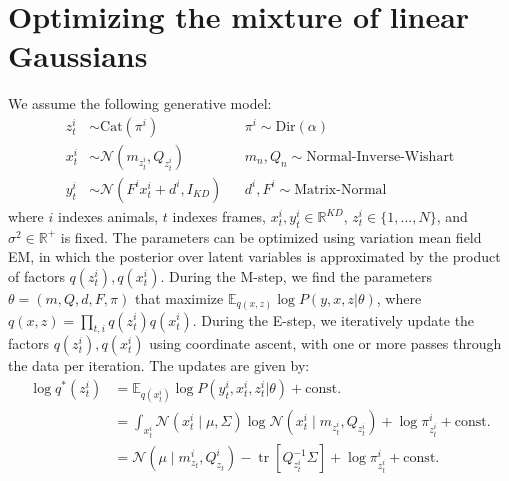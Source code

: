 \documentclass{article}         %
\DeclareMathOperator{\tr}{tr}
\begin{document}
\label{full-model-derivation}
\section{Optimizing the mixture of linear Gaussians}

We assume the following generative model:
\begin{align}
    z_t^i & \sim \text{Cat}(\pi^i) && 
    \pi^i \sim \text{Dir}(\alpha) \\
    x_t^i & \sim \mathcal{N}(m_{z_t^i}, Q_{z_t^i}) &&
    m_n, Q_n \sim \text{Normal-Inverse-Wishart} \\
    y_t^i & \sim \mathcal{N}(F^i x_t^i + d^i, I_{KD}) && 
    d^i, F^i \sim \text{Matrix-Normal}   
\end{align}
%
where $i$ indexes animals, $t$ indexes frames, $x_t^i, y_t^i \in \mathbb{R}^{KD}$, $z_t^i \in \{1,...,N\}$, and $\sigma^2 \in \mathbb{R}^+$ is fixed. The parameters can be optimized using variation mean field EM, in which the posterior over latent variables is approximated by the product of factors $q(z_t^i), q(x_t^i)$. During the M-step, we find the parameters $\theta = (m, Q, d, F, \pi)$  that maximize $\mathbb{E}_{q(x,z)} \log P(y,x,z | \theta)$, where $q(x,z) = \prod_{t,i} q(z_t^i) q(x_t^i)$. During the E-step, we iteratively update the factors $q(z_t^i), q(x_t^i)$ using coordinate ascent, with one or more passes through the data per iteration. The updates are given by:
\begin{align}
\log q^*(z_t^i) & = \mathbb{E}_{q(x_t^i)} \log P(y_t^i, x_t^i, z_t^i | \theta) + \text{const.} \\
& = \int_{x_t^i} \mathcal{N}(x_t^i \mid \mu, \Sigma) \log \mathcal{N}(x_t^i \mid m_{z_t^i}, Q_{z_t^i}) + \log \pi^i_{z_t^i} + \text{const.} \\
& = \mathcal{N}(\mu \mid m_{z_t}^i, Q_{z_t}^i) - \tr [Q_{z_t^i}^{-1}\Sigma] + \log \pi^i_{z_t^i} + \text{const.}
\end{align}
\end{document}
